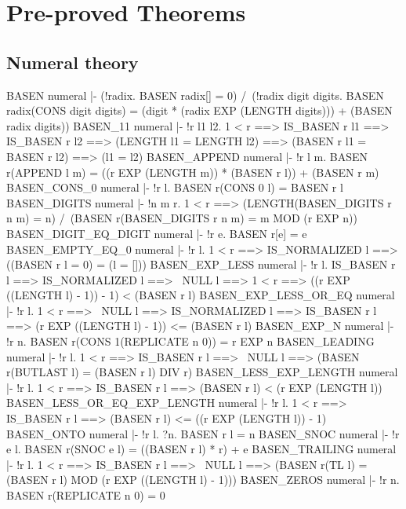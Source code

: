 \chapter{Pre-proved Theorems}

\section{Numeral theory}
\THEOREM BASEN numeral
|- (!radix. BASEN radix[] = 0) /\
   (!radix digit digits.
     BASEN radix(CONS digit digits) =
     (digit * (radix EXP (LENGTH digits))) + (BASEN radix digits))
\ENDTHEOREM
\THEOREM BASEN\_11 numeral
|- !r l1 l2.
    1 < r ==>
    IS_BASEN r l1 ==>
    IS_BASEN r l2 ==>
    (LENGTH l1 = LENGTH l2) ==>
    (BASEN r l1 = BASEN r l2) ==>
    (l1 = l2)
\ENDTHEOREM
\THEOREM BASEN\_APPEND numeral
|- !r l m.
    BASEN r(APPEND l m) =
    ((r EXP (LENGTH m)) * (BASEN r l)) + (BASEN r m)
\ENDTHEOREM
\THEOREM BASEN\_CONS\_0 numeral
|- !r l. BASEN r(CONS 0 l) = BASEN r l
\ENDTHEOREM
\THEOREM BASEN\_DIGITS numeral
|- !n m r.
    1 < r ==>
    (LENGTH(BASEN_DIGITS r n m) = n) /\
    (BASEN r(BASEN_DIGITS r n m) = m MOD (r EXP n))
\ENDTHEOREM
\THEOREM BASEN\_DIGIT\_EQ\_DIGIT numeral
|- !r e. BASEN r[e] = e
\ENDTHEOREM
\THEOREM BASEN\_EMPTY\_EQ\_0 numeral
|- !r l. 1 < r ==> IS_NORMALIZED l ==> ((BASEN r l = 0) = (l = []))
\ENDTHEOREM
\THEOREM BASEN\_EXP\_LESS numeral
|- !r l.
    IS_BASEN r l ==>
    IS_NORMALIZED l ==>
    ~NULL l ==>
    1 < r ==>
    ((r EXP ((LENGTH l) - 1)) - 1) < (BASEN r l)
\ENDTHEOREM
\THEOREM BASEN\_EXP\_LESS\_OR\_EQ numeral
|- !r l.
    1 < r ==>
    ~NULL l ==>
    IS_NORMALIZED l ==>
    IS_BASEN r l ==>
    (r EXP ((LENGTH l) - 1)) <= (BASEN r l)
\ENDTHEOREM
\THEOREM BASEN\_EXP\_N numeral
|- !r n. BASEN r(CONS 1(REPLICATE n 0)) = r EXP n
\ENDTHEOREM
\THEOREM BASEN\_LEADING numeral
|- !r l.
    1 < r ==>
    IS_BASEN r l ==>
    ~NULL l ==>
    (BASEN r(BUTLAST l) = (BASEN r l) DIV r)
\ENDTHEOREM
\THEOREM BASEN\_LESS\_EXP\_LENGTH numeral
|- !r l. 1 < r ==> IS_BASEN r l ==> (BASEN r l) < (r EXP (LENGTH l))
\ENDTHEOREM
\THEOREM BASEN\_LESS\_OR\_EQ\_EXP\_LENGTH numeral
|- !r l.
    1 < r ==> IS_BASEN r l ==> (BASEN r l) <= ((r EXP (LENGTH l)) - 1)
\ENDTHEOREM
\THEOREM BASEN\_ONTO numeral
|- !r l. ?n. BASEN r l = n
\ENDTHEOREM
\THEOREM BASEN\_SNOC numeral
|- !r e l. BASEN r(SNOC e l) = ((BASEN r l) * r) + e
\ENDTHEOREM
\THEOREM BASEN\_TRAILING numeral
|- !r l.
    1 < r ==>
    IS_BASEN r l ==>
    ~NULL l ==>
    (BASEN r(TL l) = (BASEN r l) MOD (r EXP ((LENGTH l) - 1)))
\ENDTHEOREM
\THEOREM BASEN\_ZEROS numeral
|- !r n. BASEN r(REPLICATE n 0) = 0

